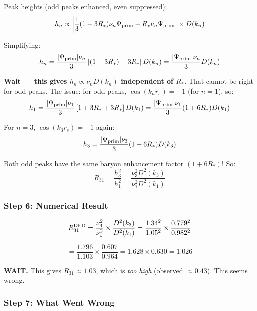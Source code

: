 \documentclass[11pt,a4paper]{article}
\begin{document}
Peak heights (odd peaks enhanced, even suppressed):
\begin{equation}
h_n \propto \left|\frac{1}{3}(1+3R_*)\nu_n\Psi_{\rm prim} - R_*\nu_n\Psi_{\rm prim}\right| \times D(k_n)
\end{equation}

Simplifying:
\begin{equation}
h_n = \frac{|\Psi_{\rm prim}|\nu_n}{3}\left|(1+3R_*) - 3R_*\right| D(k_n) = \frac{|\Psi_{\rm prim}|\nu_n}{3} D(k_n)
\end{equation}

\textbf{Wait --- this gives $h_n \propto \nu_n D(k_n)$ independent of $R_*$.} That cannot be right for odd peaks. The issue: for odd peaks, $\cos(k_n r_s) = -1$ (for $n=1$), so:
\begin{equation}
h_1 = \frac{|\Psi_{\rm prim}|\nu_1}{3}\left[1 + 3R_* + 3R_*\right]D(k_1) = \frac{|\Psi_{\rm prim}|\nu_1}{3}(1 + 6R_*)D(k_1)
\end{equation}

For $n=3$, $\cos(k_3 r_s) = -1$ again:
\begin{equation}
h_3 = \frac{|\Psi_{\rm prim}|\nu_3}{3}(1 + 6R_*)D(k_3)
\end{equation}

Both odd peaks have the same baryon enhancement factor $(1+6R_*)$! So:
\begin{equation}
R_{31} = \frac{h_3^2}{h_1^2} = \frac{\nu_3^2 D^2(k_3)}{\nu_1^2 D^2(k_1)}
\end{equation}

\subsubsection{Step 6: Numerical Result}

\begin{equation}
R_{31}^{\rm DFD} = \frac{\nu_3^2}{\nu_1^2} \times \frac{D^2(k_3)}{D^2(k_1)} = \frac{1.34^2}{1.05^2} \times \frac{0.779^2}{0.982^2}
\end{equation}

\begin{equation}
= \frac{1.796}{1.103} \times \frac{0.607}{0.964} = 1.628 \times 0.630 = 1.026
\end{equation}

\textbf{WAIT.} This gives $R_{31} \approx 1.03$, which is \emph{too high} (observed $\approx 0.43$). This seems wrong.

\subsubsection{Step 7: What Went Wrong}
\end{document}
